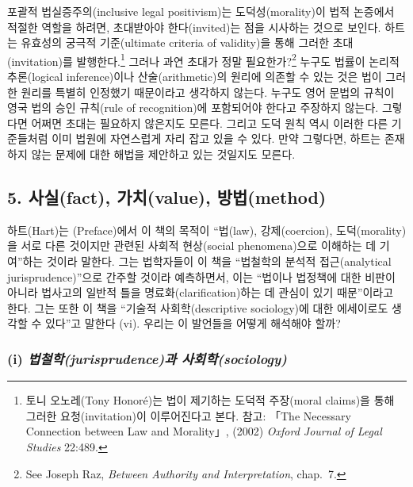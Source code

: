 \documentclass[12pt, oneside]{book}  %
\begin{document}
포괄적 법실증주의(inclusive legal positivism)는 도덕성(morality)이 법적
논증에서 적절한 역할을 하려면, 초대받아야 한다(invited)는 점을 시사하는
것으로 보인다. 하트는 유효성의 궁극적 기준(ultimate criteria of
validity)을 통해 그러한 초대(invitation)를 발행한다.\footnote{토니
  오노레(Tony Honoré)는 법이 제기하는 도덕적 주장(moral claims)을 통해
  그러한 요청(invitation)이 이루어진다고 본다. 참고: 「The Necessary
  Connection between Law and Morality」, (2002) \emph{Oxford Journal of
  Legal Studies} 22:489.} 그러나 과연 초대가 정말 필요한가?\footnote{See
  Joseph Raz, \emph{Between Authority and Interpretation}, chap.~7.}
누구도 법률이 논리적 추론(logical inference)이나 산술(arithmetic)의
원리에 의존할 수 있는 것은 법이 그러한 원리를 특별히 인정했기 때문이라고
생각하지 않는다. 누구도 영어 문법의 규칙이 영국 법의 승인 규칙(rule of
recognition)에 포함되어야 한다고 주장하지 않는다. 그렇다면 어쩌면 초대는
필요하지 않은지도 모른다. 그리고 도덕 원칙 역시 이러한 다른 기준들처럼
이미 법원에 자연스럽게 자리 잡고 있을 수 있다. 만약 그렇다면, 하트는
존재하지 않는 문제에 대한 해법을 제안하고 있는 것일지도 모른다.

\subsection{\texorpdfstring{\textbf{5. 사실(fact), 가치(value),
방법(method)}}{5. 사실(fact), 가치(value), 방법(method)}}\label{uxc0acuxc2e4fact-uxac00uxce58value-uxbc29uxbc95method}

하트(Hart)는 (Preface)에서 이 책의 목적이 ``법(law), 강제(coercion),
도덕(morality)을 서로 다른 것이지만 관련된 사회적 현상(social
phenomena)으로 이해하는 데 기여''하는 것이라 말한다. 그는 법학자들이 이
책을 ``법철학의 분석적 접근(analytical jurisprudence)''으로 간주할
것이라 예측하면서, 이는 ``법이나 법정책에 대한 비판이 아니라 법사고의
일반적 틀을 명료화(clarification)하는 데 관심이 있기 때문''이라고 한다.
그는 또한 이 책을 ``기술적 사회학(descriptive sociology)에 대한
에세이로도 생각할 수 있다''고 말한다 (vi). 우리는 이 발언들을 어떻게
해석해야 할까?

\subsubsection{\texorpdfstring{(i) \emph{법철학(jurisprudence)과
사회학(sociology)}}{(i) 법철학(jurisprudence)과 사회학(sociology)}}\label{i-uxbc95uxcca0uxd559jurisprudenceuxacfc-uxc0acuxd68cuxd559sociology}
\end{document}
